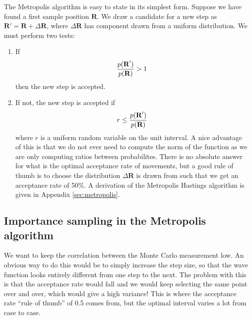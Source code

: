 \documentclass[aps,prc,twocolumn,floatfix]{revtex4}
\def\Rvec{\textbf{R}}
\begin{document}
The Metropolis algorithm is easy to state in its simplest form. Suppose we have found a first sample position $\Rvec$. We draw a candidate for a new step as $\Rvec' = \Rvec + \Delta \Rvec$, where $\Delta \Rvec$ has component drawn from a uniform distribution. We must perform two tests: 
\begin{enumerate}
 \item If 
 \begin{equation}
  {p(\Rvec') \over p(\Rvec)} > 1
 \end{equation}
 then the new step is accepted. 
 \item If not, the new step is accepted if
 \begin{equation}
  r \le {p(\Rvec') \over p(\Rvec)}
 \end{equation}
where $r$ is a uniform random variable on the unit interval. A nice advantage of this is that we do not ever need to compute the norm of the function as we are only computing ratios between probabilites. There is no absolute answer for what is the optimal acceptance rate of movements, but a good rule of thumb is to choose the distribution $\Delta \Rvec$ is drawn from such that we get an acceptance rate of 50\%. A derivation of the Metropolis Hastings algorithm is given in Appendix \ref{sec:metropolis}.
\end{enumerate}
\subsection{Importance sampling in the Metropolis algorithm}
 We want to keep the correlation between the Monte Carlo measurement low. An obvious way to do this would be to simply increase the step size, so that the wave function looks entirely different from one step to the next. The problem with this is that the acceptance rate would fall and we would keep selecting the same point over and over, which would give a high variance! This is where the acceptance rate ``rule of thumb'' of 0.5 comes from, but the optimal interval varies a lot from case to case.
 
\end{document}
